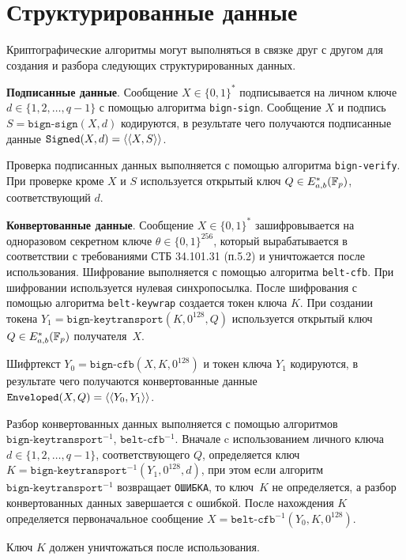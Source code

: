 \section{Структурированные данные}\label{CRYPTO.SignedEnveloped}

Криптографические алгоритмы могут выполняться в связке друг с другом для 
создания и разбора следующих структурированных данных.

{\bf Подписанные данные}.
Сообщение $X \in\{0, 1\}^*$ подписывается на личном ключе 
$d \in\{1, 2,\ldots, q-1\}$ с помощью алгоритма \texttt{bign-sign}.
Сообщение $X$ и подпись $S = \texttt{bign-sign}(X, d)$ кодируются, 
в результате чего получаются подписанные 
данные $\texttt{Signed}(X, d) = \langle\langle X, S \rangle\rangle$.

Проверка подписанных данных выполняется с помощью алгоритма \texttt{bign-verify}.
При проверке кроме $X$ и $S$ используется открытый ключ $Q \in E_{a,b}^*({\mathbb F}_p)$, 
соответствующий $d$.

{\bf Конвертованные данные}.
Сообщение $X\in\{0,1\}^*$ зашифровывается на 
одноразовом секретном ключе $\theta\in\{0,1\}^{256}$, который вырабатывается в 
соответствии с требованиями СТБ 34.101.31 (п.5.2) и уничтожается после 
использования. Шифрование выполняется с помощью алгоритма \texttt{belt-cfb}. При 
шифровании используется нулевая синхропосылка. После шифрования с помощью 
алгоритма \texttt{belt-keywrap} создается токен ключа $K$.
При создании токена $Y_1 = \texttt{bign-keytransport}(K, 0^{128}, Q)$ 
используется открытый ключ $Q \in E_{a,b}^*({\mathbb F}_p)$ получателя~$X$.

Шифртекст $Y_0 = \texttt{bign-cfb}(X, K, 0^{128})$ и токен ключа $Y_1$ 
кодируются, в результате чего получаются конвертованные данные 
$\texttt{Enveloped}(X, Q) = \langle\langle Y_0, Y_1\rangle\rangle$.

Разбор конвертованных данных выполняется с помощью алгоритмов 
$\texttt{bign-keytransport}^{-1}$, $\texttt{belt-cfb}^{-1}$. Вначале c 
использованием личного ключа $d \in\{1, 2,\ldots, q-1\}$, 
соответствующего $Q$, определяется ключ 
$K = \texttt{bign-keytransport}^{-1}(Y_1, 0^{128}, d)$, 
при этом если алгоритм~$\texttt{bign-keytransport}^{-1}$ возвращает \texttt{ОШИБКА}, 
то ключ~$K$ не определяется, а разбор конвертованных данных завершается с 
ошибкой. После нахождения $K$ определяется первоначальное сообщение 
$X = \texttt{belt-cfb}^{-1}(Y_0, K, 0^{128})$.

Ключ $K$ должен уничтожаться после использования.

